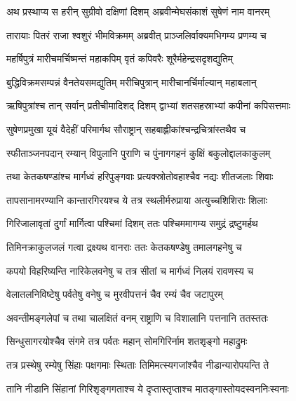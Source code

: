 
\twolineshloka
{अथ प्रस्थाप्य स हरीन् सुग्रीवो दक्षिणां दिशम्}
{अब्रवीन्मेघसंकाशं सुषेणं नाम वानरम्} %

\twolineshloka
{तारायाः पितरं राजा श्वशुरं भीमविक्रमम्}
{अब्रवीत् प्राञ्जलिर्वाक्यमभिगम्य प्रणम्य च} %

\twolineshloka
{महर्षिपुत्रं मारीचमर्चिष्मन्तं महाकपिम्}
{वृतं कपिवरैः शूरैर्महेन्द्रसदृशद्युतिम्} %

\twolineshloka
{बुद्धिविक्रमसम्पन्नं वैनतेयसमद्युतिम्}
{मरीचिपुत्रान् मारीचानर्चिर्माल्यान् महाबलान्} %

\twolineshloka
{ऋषिपुत्रांश्च तान् सर्वान् प्रतीचीमादिशद् दिशम्}
{द्वाभ्यां शतसहस्राभ्यां कपीनां कपिसत्तमाः} %

\twolineshloka
{सुषेणप्रमुखा यूयं वैदेहीं परिमार्गथ}
{सौराष्ट्रान् सहबाह्लीकांश्चन्द्रचित्रांस्तथैव च} %

\twolineshloka
{स्फीताञ्जनपदान् रम्यान् विपुलानि पुराणि च}
{पुंनागगहनं कुक्षिं बकुलोद्दालकाकुलम्} %

\twolineshloka
{तथा केतकषण्डांश्च मार्गध्वं हरिपुङ्गवाः}
{प्रत्यक्स्रोतोवहाश्चैव नद्यः शीतजलाः शिवाः} %

\twolineshloka
{तापसानामरण्यानि कान्तारगिरयश्च ये}
{तत्र स्थलीर्मरुप्राया अत्युच्चशिशिराः शिलाः} %

\twolineshloka
{गिरिजालावृतां दुर्गां मार्गित्वा पश्चिमां दिशम्}
{ततः पश्चिममागम्य समुद्रं द्रष्टुमर्हथ} %

\twolineshloka
{तिमिनक्राकुलजलं गत्वा द्रक्ष्यथ वानराः}
{ततः केतकषण्डेषु तमालगहनेषु च} %

\twolineshloka
{कपयो विहरिष्यन्ति नारिकेलवनेषु च}
{तत्र सीतां च मार्गध्वं निलयं रावणस्य च} %

\twolineshloka
{वेलातलनिविष्टेषु पर्वतेषु वनेषु च}
{मुरवीपत्तनं चैव रम्यं चैव जटापुरम्} %

\twolineshloka
{अवन्तीमङ्गलेपां च तथा चालक्षितं वनम्}
{राष्ट्राणि च विशालानि पत्तनानि ततस्ततः} %

\twolineshloka
{सिन्धुसागरयोश्चैव संगमे तत्र पर्वतः}
{महान् सोमगिरिर्नाम शतशृङ्गो महाद्रुमः} %

\twolineshloka
{तत्र प्रस्थेषु रम्येषु सिंहाः पक्षगमाः स्थिताः}
{तिमिमत्स्यगजांश्चैव नीडान्यारोपयन्ति ते} %

\twolineshloka
{तानि नीडानि सिंहानां गिरिशृङ्गगताश्च ये}
{दृप्तास्तृप्ताश्च मातङ्गास्तोयदस्वननिःस्वनाः} %

